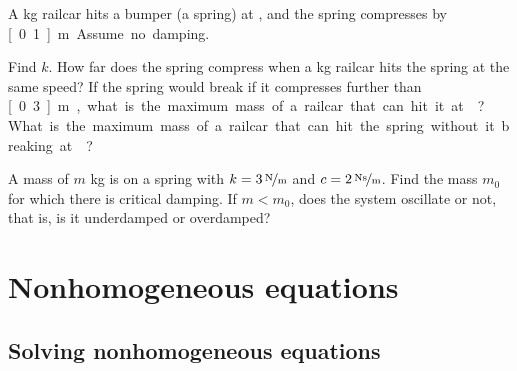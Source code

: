 \begin{exercise}
\pagebreak[2]
A \unit[5,000]{kg} railcar hits a bumper (a spring) at ,
and the spring compresses by \unit[0.1]{m}.  Assume no damping.
\begin{tasks}
\task Find $k$.
\task How far does the spring compress when a
\unit[10,000]{kg} railcar hits the spring at the same speed?
\task If the spring
would break if it compresses further than \unit[0.3]{m}, what is the maximum
mass of a railcar that can hit it at ?
\task What is
the maximum mass of a railcar that can hit the spring without it breaking
at ?
\end{tasks}
\end{exercise}

\begin{exercise}
A mass of $m$ \unit{kg} is on a spring with $k=\unitfrac[3]{N}{m}$ and
$c=\unitfrac[2]{Ns}{m}$.  Find the mass $m_0$ for which there is critical
damping.  If $m < m_0$, does the system oscillate or not, that is, is it
underdamped or overdamped?
\end{exercise}


\sectionnewpage
\section{Nonhomogeneous equations}
\label{sec:nonhom}



\subsection{Solving nonhomogeneous equations}

